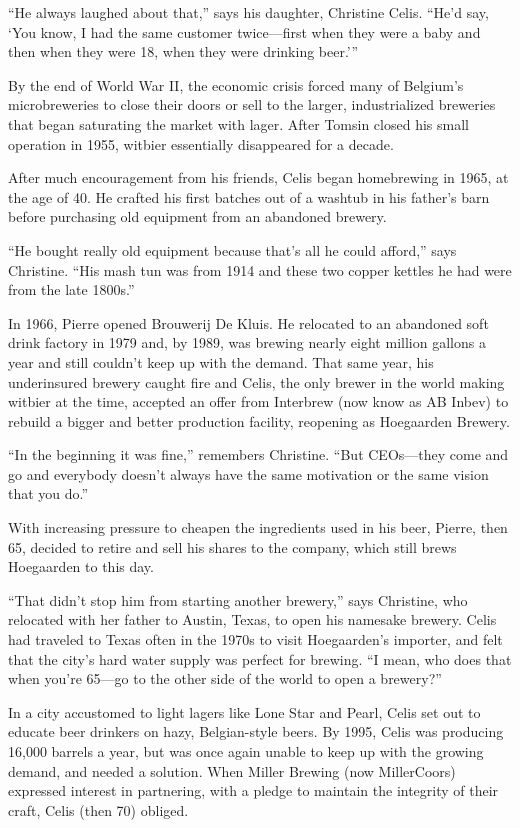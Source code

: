 \documentclass[a4paper,parskip=half]{scrartcl}
\begin{document}
“He always laughed about that,” says his daughter, Christine Celis. “He’d say, ‘You know, I had the same customer twice—first when they were a baby and then when they were 18, when they were drinking beer.’”

By the end of World War II, the economic crisis forced many of Belgium’s microbreweries to close their doors or sell to the larger, industrialized breweries that began saturating the market with lager. After Tomsin closed his small operation in 1955, witbier essentially disappeared for a decade.

After much encouragement from his friends, Celis began homebrewing in 1965, at the age of 40. He crafted his first batches out of a washtub in his father’s barn before purchasing old equipment from an abandoned brewery.

“He bought really old equipment because that’s all he could afford,” says Christine. “His mash tun was from 1914 and these two copper kettles he had were from the late 1800s.”

In 1966, Pierre opened Brouwerij De Kluis. He relocated to an abandoned soft drink factory in 1979 and, by 1989, was brewing nearly eight million gallons a year and still couldn’t keep up with the demand. That same year, his underinsured brewery caught fire and Celis, the only brewer in the world making witbier at the time, accepted an offer from Interbrew (now know as AB Inbev) to rebuild a bigger and better production facility, reopening as Hoegaarden Brewery.

“In the beginning it was fine,” remembers Christine. “But CEOs—they come and go and everybody doesn’t always have the same motivation or the same vision that you do.”

With increasing pressure to cheapen the ingredients used in his beer, Pierre, then 65, decided to retire and sell his shares to the company, which still brews Hoegaarden to this day.

“That didn’t stop him from starting another brewery,” says Christine, who relocated with her father to Austin, Texas, to open his namesake brewery. Celis had traveled to Texas often in the 1970s to visit Hoegaarden’s importer, and felt that the city’s hard water supply was perfect for brewing. “I mean, who does that when you’re 65—go to the other side of the world to open a brewery?”

In a city accustomed to light lagers like Lone Star and Pearl, Celis set out to educate beer drinkers on hazy, Belgian-style beers. By 1995, Celis was producing 16,000 barrels a year, but was once again unable to keep up with the growing demand, and needed a solution. When Miller Brewing (now MillerCoors) expressed interest in partnering, with a pledge to maintain the integrity of their craft, Celis (then 70) obliged.
\end{document}
